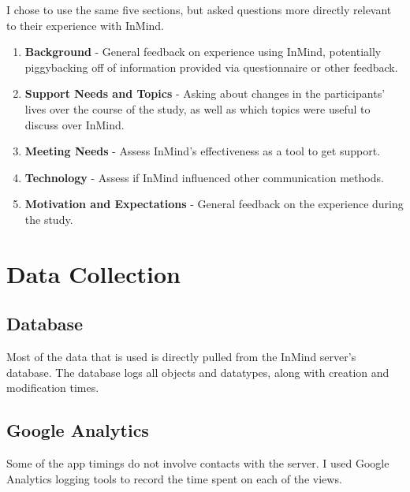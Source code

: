   I chose to use the same five sections,
  but asked questions more directly relevant to their experience with InMind.
  \begin{enumerate}
  \item \textbf{Background} - 
  General feedback on experience using InMind,
  potentially piggybacking off of information provided via questionnaire
  or other feedback.
  \item \textbf{Support Needs and Topics} - 
  Asking about changes in the participants' lives over the course of the study,
  as well as which topics were useful to discuss over InMind.
  \item \textbf{Meeting Needs} - 
  Assess InMind's effectiveness as a tool to get support.
  \item \textbf{Technology} - 
  Assess if InMind influenced other communication methods.
  \item \textbf{Motivation and Expectations} - 
  General feedback on the experience during the study.
  \end{enumerate}

\section{Data Collection}
  \subsection{Database}
    Most of the data that is used is directly pulled from
    the InMind server's database.
    The database logs all objects and datatypes,
    along with creation and modification times.

  \subsection{Google Analytics}
    Some of the app timings do not involve contacts with the server.
    I used Google Analytics logging tools to record the time spent
    on each of the views.
